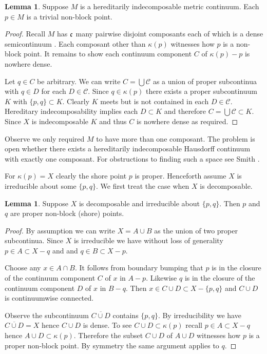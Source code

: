 \documentclass[12pt]{article}
\theoremstyle{plain}
\theoremstyle{definition}
\newtheorem{lemma}[theorem]{Lemma}
\newcommand{\K}{\ensuremath{\kappa}}
\newcommand{\0}{\ensuremath{\varnothing}}
\newcommand{\cC}{\ensuremath{\mathcal C}}
\newcommand{\cn}{\ensuremath{\frak c}}
\begin{document}
\begin{lemma}
Suppose $M$ is a hereditarily indecomposable metric continuum. 
Each $p \in M$ is a trivial non-block point.
\end{lemma}

\begin{proof}
Recall $M$ has $\cn$ many pairwise disjoint composants each of which is a dense semicontinuum \cite{Ccomposants}.
Each composant other than $\K(p)$ witnesses how $p$ is a non-block point.
It remains to show each continuum component $C$ of $\K(p)-p$ is nowhere dense.

Let $q \in C$ be arbitrary.
We can write $C = \bigcup \cC$ as a union of proper subcontinua with $q \in D$ for each $D \in \cC$.
Since $q \in \K(p)$ there exists a proper subcontinuum $K$ with $\{p,q\} \subset K$.
Clearly $K$ meets but is not contained in each $D \in \cC$.
Hereditary indecomposability implies each $D \subset K$ and therefore $C = \bigcup \cC \subset K$.
Since $X$ is indecomposable $K$ and thus $C$ is nowhere dense as required.
\end{proof}

Observe we only required $M$ to have more than one composant.
The problem is open whether there exists a hereditarily indecomposable Hausdorff continuum
with exactly one composant. 
For obstructions to finding such a space see Smith 
\cite{SmithHIRemainderProd, SmithHILexProd, SmithHISouslinArcsIL, SmithHISouslinProd}. 

For $\K(p) = X$ clearly the shore point $p$ is proper.
Henceforth assume  $X$ is irreducible about some $\{p,q\}$.
We first treat the case when $X$ is decomposable.

\begin{lemma}\label{dec}
Suppose $X$ is decomposable and irreducible about $\{p,q\}$. 
Then $p$ and $q$ are proper non-block (shore) points.
\end{lemma}

\begin{proof}

By assumption we can write $X = A \cup B$ as the union of two proper subcontinua.
Since $X$ is irreducible we have without loss of generality $p \in A \subset X-q$ and and $q \in B \subset X-p$.

Choose any $x \in A \cap B$. It follows from boundary bumping that $p$ is in the closure of the continuum component $C$ of $x$ in $A-p$.
Likewise $q$ is in the closure of the continuum component $D$ of $x$ in $B-q$.
Then $x \in C \cup D \subset X-\{p,q\}$ and $C \cup D$ is continuumwise connected.

Observe the subcontinuum $\overline {C \cup D}$ contains $\{p,q\}$.
By irreducibility we have $\overline {C \cup D} = X$ hence $C \cup D$ is dense.
To see $C \cup D \subset \K(p)$ recall $p \in A \subset X-q$ hence $A \cup D \subset \K(p)$. 
Therefore the subset $C \cup D$ of $A \cup D$ witnesses how $p$ is a proper non-block point. By symmetry the same argument applies to $q$. 
\end{proof}
\end{document}
